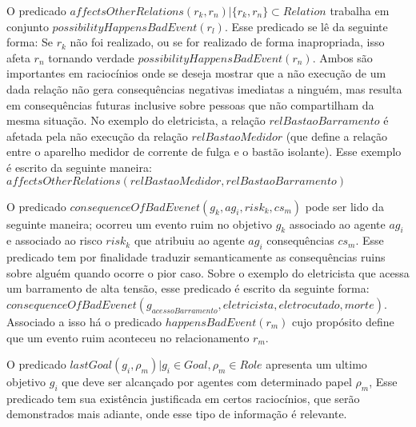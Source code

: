 O predicado $affectsOtherRelations(r_k,r_n) | \{ r_k, r_n\} \subset Relation $ trabalha em conjunto $possibilityHappensBadEvent(r_l)$. Esse predicado se lê da seguinte forma: Se $r_k$ não foi realizado, ou se for realizado de forma inapropriada, isso afeta  $r_n$ tornando verdade 
$possibilityHappensBadEvent(r_n)$. Ambos são importantes em raciocínios onde se deseja mostrar que a não execução de um dada relação não gera consequências negativas imediatas a ninguém, mas resulta em consequências futuras inclusive sobre pessoas que não compartilham da mesma situação. No exemplo do eletricista, a relação $relBastaoBarramento$ é afetada pela não execução da relação $relBastaoMedidor$ (que define a relação entre o aparelho medidor de corrente de fulga e o bastão isolante). Esse exemplo é escrito da seguinte maneira:$affectsOtherRelations(relBastaoMedidor,relBastaoBarramento)$

O predicado $consequenceOfBadEvenet(g_k, ag_i,risk_k,cs_m)$ pode ser lido da seguinte maneira; ocorreu um evento ruim no 
objetivo $g_k$ associado ao agente $ag_i$ e associado ao risco $risk_k$ que atribuiu ao agente $ag_i$ consequências $cs_m$. Esse 
predicado tem por finalidade traduzir semanticamente as consequências ruins sobre alguém quando ocorre o pior caso. Sobre o exemplo 
do eletricista que acessa um barramento de alta tensão, esse predicado é escrito da seguinte forma: $consequenceOfBadEvenet(g_{acessoBarramento}, eletricista,eletrocutado,morte)$. Associado a isso há o predicado $happensBadEvent(r_m)$ cujo propósito define que um evento ruim aconteceu no relacionamento $r_m$.

O predicado $lastGoal(g_i,\rho_m) | g_i \in Goal, \rho_m \in Role $ apresenta um ultimo objetivo $g_i$ que deve ser alcançado 
por agentes com determinado papel $\rho_m$, Esse predicado tem sua existência justificada em certos raciocínios, que serão demonstrados 
mais adiante, onde esse tipo de informação é relevante.